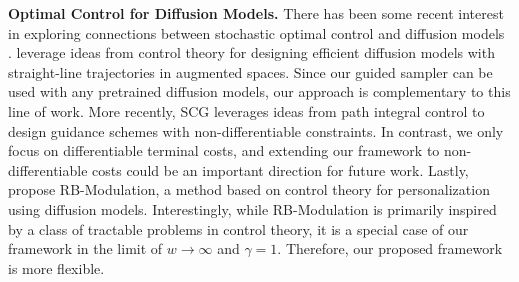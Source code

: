 \textbf{Optimal Control for Diffusion Models.} There has been some recent interest in exploring connections between stochastic optimal control and diffusion models \citep{berner2024an}. \citet{chen2024generative} leverage ideas from control theory for designing efficient diffusion models with straight-line trajectories in augmented spaces. Since our guided sampler can be used with any pretrained diffusion models, our approach is complementary to this line of work. More recently, SCG \citep{HuangGLHZSGOY24} leverages ideas from path integral control to design guidance schemes with non-differentiable constraints. In contrast, we only focus on differentiable terminal costs, and extending our framework to non-differentiable costs could be an important direction for future work. Lastly, \citet{rout2024rbmodulationtrainingfreepersonalizationdiffusion} propose RB-Modulation, a method based on control theory for personalization using diffusion models. Interestingly, while RB-Modulation is primarily inspired by a class of tractable problems in control theory, it is a special case of our framework in the limit of $ w \rightarrow \infty$ and $\gamma=1$. Therefore, our proposed framework is more flexible.
